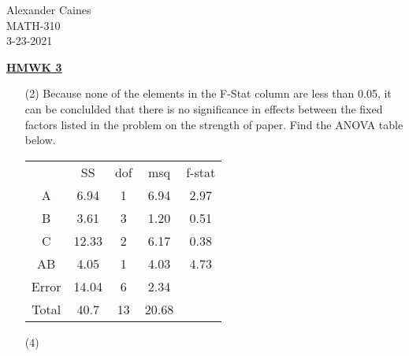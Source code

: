 \documentclass[12pt]{article}
\begin{document}
\vspace{1.0 \baselineskip}

\begin{flushright}
	Alexander Caines\\
	MATH-310\\
	3-23-2021\\
\end{flushright}

\begin{center}
	\textbf{\underline{HMWK 3}}
\end{center}



\begin{enumerate}
	\item[(2)] Because none of the elements in the F-Stat column are less than 0.05, it can be conclulded that there 
	is no significance in effects between the fixed factors listed in the problem on the strength of paper. Find the ANOVA table below.\\
		\begin{center}
			\begin{tabular}{c|c|c|c|c}
				& SS & dof & msq & f-stat\\
				A & 6.94 & 1 & 6.94 & 2.97\\
				B & 3.61 & 3 & 1.20 & 0.51\\
				C & 12.33 & 2 & 6.17 & 0.38\\
				AB & 4.05 & 1 & 4.03 & 4.73\\
				Error & 14.04 & 6 & 2.34 & \\
				\hline
				Total & 40.7 & 13 & 20.68 & \\
			\end{tabular}
		\end{center}
	\item[(4)]
\end{enumerate}
\end{document}
